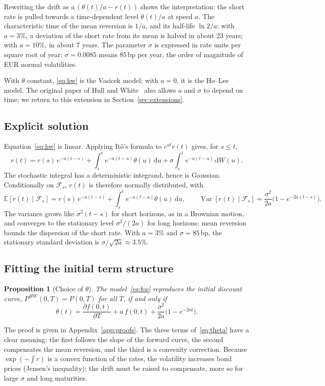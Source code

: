 \documentclass[11pt,a4paper]{article}
\theoremstyle{plain}
\newtheorem{proposition}[theorem]{Proposition}
\theoremstyle{definition}
\newcommand{\dd}{\mathrm{d}}
\newcommand{\E}{\mathbb{E}}
\newcommand{\F}{\mathcal{F}}
\newcommand{\bp}{\,\mathrm{bp}}
\DeclareMathOperator{\Var}{Var}
\begin{document}
Rewriting the drift as $a\,(\theta(t)/a-r(t))$ shows the interpretation: the short rate is pulled towards a time-dependent level $\theta(t)/a$ at speed $a$. The characteristic time of the mean reversion is $1/a$, and its half-life $\ln 2/a$: with $a=3\%$, a deviation of the short rate from its mean is halved in about 23 years; with $a=10\%$, in about 7 years. The parameter $\sigma$ is expressed in rate units per square root of year: $\sigma=0.0085$ means $85\bp$ per year, the order of magnitude of EUR normal volatilities.

With $\theta$ constant, \eqref{eq:hw} is the Vasicek model; with $a=0$, it is the Ho--Lee model. The original paper of Hull and White~\cite{hullwhite} also allows $a$ and $\sigma$ to depend on time; we return to this extension in Section~\ref{sec:extensions}.

\subsection{Explicit solution}
Equation~\eqref{eq:hw} is linear. Applying Itô's formula to $e^{at}r(t)$ gives, for $s\leq t$,
\begin{equation}
    r(t)=r(s)\,e^{-a(t-s)}+\int_s^t e^{-a(t-u)}\theta(u)\,\dd u+\sigma\int_s^te^{-a(t-u)}\,\dd W(u).
    \label{eq:solution}
\end{equation}
The stochastic integral has a deterministic integrand, hence is Gaussian. Conditionally on $\F_s$, $r(t)$ is therefore normally distributed, with
\begin{equation}
    \E[r(t)\mid\F_s]=r(s)\,e^{-a(t-s)}+\int_s^te^{-a(t-u)}\theta(u)\,\dd u,
    \qquad
    \Var[r(t)\mid\F_s]=\frac{\sigma^2}{2a}\bigl(1-e^{-2a(t-s)}\bigr).
    \label{eq:moments}
\end{equation}
The variance grows like $\sigma^2(t-s)$ for short horizons, as in a Brownian motion, and converges to the stationary level $\sigma^2/(2a)$ for long horizons: mean reversion bounds the dispersion of the short rate. With $a=3\%$ and $\sigma=85\bp$, the stationary standard deviation is $\sigma/\sqrt{2a}\approx3.5\%$.

\subsection{Fitting the initial term structure}
\begin{proposition}[Choice of $\theta$]\label{prop:theta}
The model~\eqref{eq:hw} reproduces the initial discount curve, $P^{HW}(0,T)=P(0,T)$ for all $T$, if and only if
\begin{equation}
    \theta(t)=\frac{\partial f(0,t)}{\partial T}+a\,f(0,t)+\frac{\sigma^2}{2a}\bigl(1-e^{-2at}\bigr).
    \label{eq:theta}
\end{equation}
\end{proposition}
The proof is given in Appendix~\ref{app:proofs}. The three terms of~\eqref{eq:theta} have a clear meaning: the first follows the slope of the forward curve, the second compensates the mean reversion, and the third is a convexity correction. Because $\exp(-\int r)$ is a convex function of the rates, the volatility increases bond prices (Jensen's inequality); the drift must be raised to compensate, more so for large $\sigma$ and long maturities.
\end{document}
